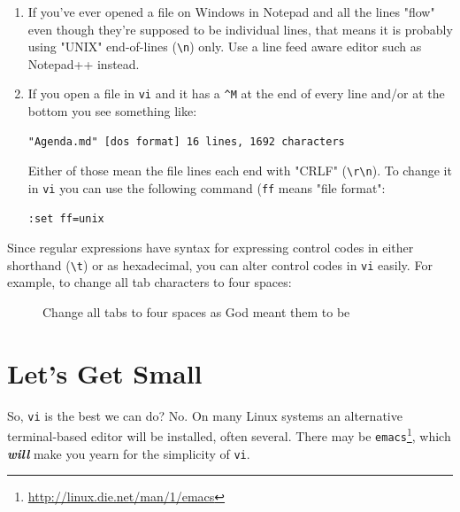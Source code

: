 \documentclass[10pt,american,]{book}
\makeatletter
\newenvironment{Shaded}{\begin{snugshade}}{\end{snugshade}}
\newcommand{\KeywordTok}[1]{\textcolor[rgb]{0.13,0.29,0.53}{\textbf{{#1}}}}
\newcommand{\OtherTok}[1]{\textcolor[rgb]{0.56,0.35,0.01}{{#1}}}
\newcommand{\NormalTok}[1]{{#1}}
\renewcommand{\href}[2]{#2\footnote{\url{#1}}}
\numberwithin{figure}{chapter}
\DeclareRobustCommand{\drcap}[1]{\begin{figure}[H]\caption{#1}\end{figure}}
\DeclareRobustCommand{\drcmd}[1]{\index{Commands!#1@\texttt{#1}}}
\renewcommand{\KeywordTok}[1]{{#1}}
\renewcommand{\OtherTok}[1]{{#1}}
\renewcommand{\NormalTok}[1]{{#1}}
\makeatother
\begin{document}
\begin{enumerate}
\def\labelenumi{\arabic{enumi}.}
\item
  If you've ever opened a file on Windows in Notepad and all the lines
  "flow" even though they're supposed to be individual lines, that means
  it is probably using "UNIX" end-of-lines (\texttt{\textbackslash{}n})
  only. Use a line feed aware editor such as Notepad++ instead.
\item
  If you open a file in \texttt{vi} and it has a \texttt{\^{}M} at the
  end of every line and/or at the bottom you see something like:

\begin{verbatim}
"Agenda.md" [dos format] 16 lines, 1692 characters
\end{verbatim}

  Either of those mean the file lines each end with "CRLF"
  (\texttt{\textbackslash{}r\textbackslash{}n}). To change it in
  \texttt{vi} you can use the following command (\texttt{ff} means "file
  format":

\begin{verbatim}
:set ff=unix
\end{verbatim}
\end{enumerate}

Since regular expressions have syntax for expressing control codes in
either shorthand (\texttt{\textbackslash{}t}) or as hexadecimal, you can
alter control codes in \texttt{vi} easily. For example, to change all
tab characters to four spaces:

\drcap{Change all tabs to four spaces as God meant them to be}

\begin{Shaded}
\end{Shaded}

\section*{Let's Get Small}\label{lets-get-small}

So, \texttt{vi} is the best we can do? No. On many Linux systems an
alternative terminal-based editor will be installed, often several.
There may be
\href{http://linux.die.net/man/1/emacs}{\texttt{emacs}}\drcmd{emacs},
which \textbf{\emph{will}} make you yearn for the simplicity of
\texttt{vi}.
\end{document}
